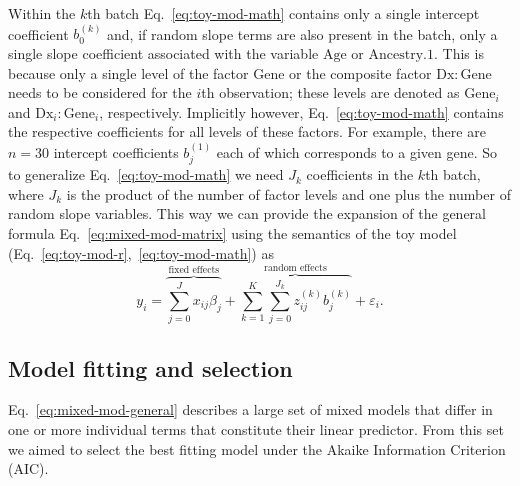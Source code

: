 \documentclass[letterpaper]{article}
\begin{document}
Within the \(k\)th batch Eq.~\ref{eq:toy-mod-math} contains only a single
intercept coefficient \(b_0^{(k)}\) and, if random slope terms are also
present in the batch, only a single slope coefficient associated with the
variable \(\mathrm{Age}\) or \(\mathrm{Ancestry.1}\).  This is because only a
single level of the factor \(\mathrm{Gene}\) or the composite factor
\(\mathrm{Dx}:\mathrm{Gene}\) needs to be considered for the \(i\)th
observation; these levels are denoted as \(\mathrm{Gene}_i\) and
\(\mathrm{Dx}_i:\mathrm{Gene}_i\), respectively.  Implicitly however,
Eq.~\ref{eq:toy-mod-math} contains the respective coefficients for all levels
of these factors.  For example, there are \(n=30\) intercept coefficients
\(b_j^{(1)}\) each of which corresponds to a given gene.  So to generalize
Eq.~\ref{eq:toy-mod-math} we need \(J_k\) coefficients in the \(k\)th batch,
where \(J_k\) is the product of the number of factor levels and one plus the
number of random slope variables.  This way we can provide the expansion of
the general formula Eq.~\ref{eq:mixed-mod-matrix} using the semantics of the
toy model (Eq.~\ref{eq:toy-mod-r},~\ref{eq:toy-mod-math}) as
\begin{equation}
y_i = \overbrace{\sum_{j=0}^J x_{ij} \beta_j}^{\text{fixed effects}} +
\overbrace{\sum_{k=1}^K \sum_{j=0}^{J_k} z_{ij}^{(k)}
b_{j}^{(k)}}^{\text{random effects}} + \varepsilon_i.
\label{eq:mixed-mod-general}
\end{equation}

\subsection*{Model fitting and selection}
\label{sec:fitting}

Eq.~\ref{eq:mixed-mod-general} describes a large set of mixed models that
differ in one or more individual terms that constitute their linear predictor.
From this set we aimed to select the best fitting model under the Akaike
Information Criterion (AIC).
\end{document}
